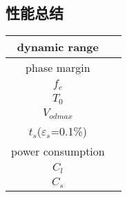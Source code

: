 \documentclass[a4paper]{article}
\begin{document}
\subsection{性能总结}
\begin{table}[htbp]
    \begin{tabular}{|c|c|}
        \hline
        dynamic range&\\
        \hline
        phase margin&\\
        \hline
        $f_c$ &\\
        \hline 
        $T_0$&\\
        \hline
        $V_{odmax}$&\\
        \hline
        $t_s$($\varepsilon_s$=0.1\%)&\\
        \hline
        power consumption&\\
        \hline
        $C_l$&\\
        \hline
        $C_s$&\\
        \hline
    \end{tabular}
\end{table}







\newpage
\end{document}
